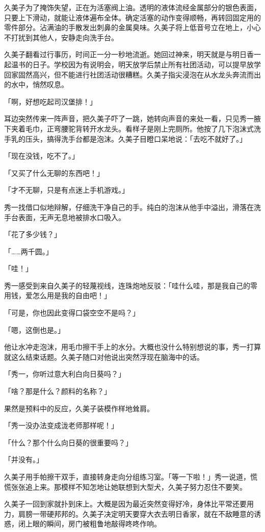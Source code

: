 \documentclass[UTF8]{ctexart}
\begin{document}
    久美子为了掩饰失望，正在为活塞阀上油。透明的液体流经金属部分的银色表面，只要上下滑动，就能让液体遍布全体。确定活塞的动作变得顺畅，再转回固定用的零件部分。沾满油的手散发出刺鼻的金属臭味。久美子将上低音号立在地上，小心不打扰到其他人，安静走向洗手台。 

    久美子翻看过行事历，时间正一分一秒地流逝。她回过神来，明天就是与明日香一起温书的日子。学校因为有说明会，明天放学后禁止所有社团活动，可以提早放学回家固然高兴，但不能进行社团活动很糟糕。久美子指尖浸泡在从水龙头奔流而出的水中，悄然叹息。 

    「啊，好想吃起司汉堡排！」 

    耳边突然传来一阵声音，把久美子吓了一跳，她转向声音的来处一看，只见秀一腋下夹着毛巾，正弯腰驼背转开水龙头。看样子是刚上完厕所。他按了几下泡沫式洗手乳的压头，搞得洗手台都是泡沫。久美子目瞪口呆地说：「去吃不就好了。」 

    「现在没钱，吃不了。」 

    「又买了什么无聊的东西吧！」 

    「才不无聊，只是有点迷上手机游戏。」 

    秀一找借口似地辩解，仔细洗干净自己的手。纯白的泡沫从他手中溢出，滑落在洗手台表面，无声无息地被排水口吸入。 

    「花了多少钱？」 

    「……两千圆。」 

    「哇！」 

    秀一感受到来自久美子的轻蔑视线，连珠炮地反驳：「哇什么哇，那是我自己的零用钱，爱怎么用是我的自由吧！」 

    「可是，你也因此变得口袋空空不是吗？」 

    「嗯，这倒也是。」 

    他让水冲走泡沫，用毛巾擦干手上的水分。大概也没什么特别想说的事，秀一打算就这么结束话题。久美子随口对他说出突然浮现在脑海中的话。 

    「秀一，你听过意大利白向日葵吗？」 

    「啥？那是什么？颜料的名称？」 

    果然是预料中的反应，久美子装模作样地耸肩。 

    「秀一没办法变成泷老师那样呢！」 

    「什么？那个什么向日葵的很重要吗？」 

    「并没有。」 

    久美子用手帕擦干双手，直接转身走向分组练习室。「等一下啦！」秀一说道，慌慌张张追上来。那模样不知怎地让她联想到大型犬，久美子努力忍住不要笑。 

    久美子一回到家就扑到床上。大概是因为最近突然变得好冷，身体比平常还要用力，肩膀一带硬邦邦的。久美子决定明天要穿大衣去明日香家，就在不敌睡意的诱惑，闭上眼的瞬间，房门被粗鲁地敲得咚咚作响。 
\end{document}
